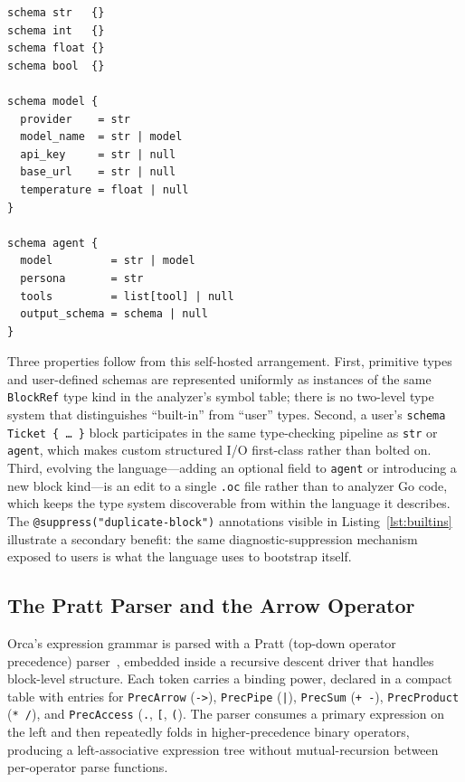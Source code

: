 \documentclass[sigconf,nonacm]{acmart}
\begin{document}
\begin{lstlisting}[caption={Excerpt from the embedded \texttt{builtins.oc}: the \texttt{model} schema is declared in the same language the compiler compiles.},label={lst:builtins}]
schema str   {}
schema int   {}
schema float {}
schema bool  {}

schema model {
  provider    = str
  model_name  = str | model
  api_key     = str | null
  base_url    = str | null
  temperature = float | null
}

schema agent {
  model         = str | model
  persona       = str
  tools         = list[tool] | null
  output_schema = schema | null
}
\end{lstlisting}

Three properties follow from this self-hosted arrangement. First, primitive
types and user-defined schemas are represented uniformly as instances of the
same \texttt{BlockRef} type kind in the analyzer's symbol table; there is no
two-level type system that distinguishes ``built-in'' from ``user'' types.
Second, a user's \texttt{schema Ticket \{ \ldots\ \}} block participates in
the same type-checking pipeline as \texttt{str} or \texttt{agent}, which
makes custom structured I/O first-class rather than bolted on. Third,
evolving the language---adding an optional field to \texttt{agent} or
introducing a new block kind---is an edit to a single \texttt{.oc} file
rather than to analyzer Go code, which keeps the type system discoverable
from within the language it describes. The \texttt{@suppress("duplicate-block")}
annotations visible in Listing~\ref{lst:builtins} illustrate a secondary
benefit: the same diagnostic-suppression mechanism exposed to users is what
the language uses to bootstrap itself.

\subsection{The Pratt Parser and the Arrow Operator}
\label{sec:implementation:pratt}

Orca's expression grammar is parsed with a Pratt (top-down operator
precedence) parser~\cite{kladov2020pratt}, embedded inside a recursive
descent driver that handles block-level structure. Each token carries a
binding power, declared in a compact table with entries for
\texttt{PrecArrow} (\texttt{->}), \texttt{PrecPipe} (\texttt{|}),
\texttt{PrecSum} (\texttt{+ -}), \texttt{PrecProduct} (\texttt{* /}), and
\texttt{PrecAccess} (\texttt{.}, \texttt{[}, \texttt{(}). The parser
consumes a primary expression on the left and then repeatedly folds in
higher-precedence binary operators, producing a left-associative expression
tree without mutual-recursion between per-operator parse functions.
\end{document}
